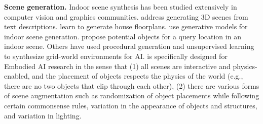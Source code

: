 \noindent \textbf{Scene generation.} Indoor scene synthesis has been studied extensively in computer vision and graphics communities. \cite{Chang2015TextT3,Chang2014LearningSK,chang2014interactive} address generating 3D scenes from text descriptions. \cite{wu2019data,Hu2020Graph2PlanLF,Nauata2021HouseGANGA} learn to generate house floorplans. \cite{Ritchie2019FastAF,Zhang2020DeepGM,Chaudhuri2019LearningGM,Wang2021SceneFormerIS,keshavarzi2020scenegen,li2019grains} use generative models for indoor scene generation. \cite{zhou2019scenegraphnet,Savva2017SceneSuggestC3} propose potential objects for a query location in an indoor scene. Others have used procedural generation \cite{khalifa2020pcgrl, earle2021learning} and unsupervised learning \cite{dennis2020emergent} to synthesize grid-world environments for AI. \env is specifically designed for Embodied AI research in the sense that (1) all scenes are interactive and physics-enabled, and the placement of objects respects the physics of the world (e.g., there are no two objects that clip through each other), (2) there are various forms of scene augmentation such as randomization of object placements while following certain commonsense rules, variation in the appearance of objects and structures, and variation in lighting. %


